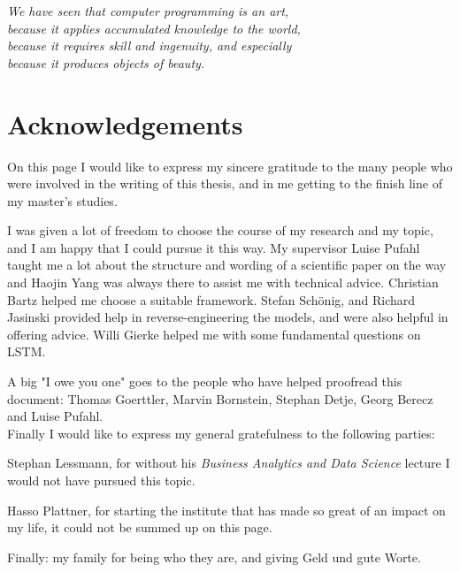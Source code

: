 
\begin{flushright}{\slshape
We have seen that computer programming is an art, \\
because it applies accumulated knowledge to the world, \\
because it requires skill and ingenuity, and especially \\
because it produces objects of beauty.} \\ \medskip
\end{flushright}

\bigskip


\begingroup

\let\clearpage\relax
\let\cleardoublepage\relax
\let\cleardoublepage\relax

\chapter*{Acknowledgements}
On this page I would like to express my sincere gratitude to the many people who were involved
in the writing of this thesis, and in me getting to the finish line of my master's studies.

I was given a lot of freedom to choose the course of my research and my topic,
and I am happy that I could pursue it this way. My supervisor Luise Pufahl
taught me a lot about the structure and wording of a scientific paper on the way
and Haojin Yang was always there to assist me with technical advice.
Christian Bartz helped me choose a suitable framework.
Stefan Schönig, and Richard Jasinski provided help in reverse-engineering the models,
and were also helpful in offering advice.
Willi Gierke helped me with some fundamental questions on LSTM.

A big "I owe you one" goes to the people who have helped proofread this document:
Thomas Goerttler, Marvin Bornstein, Stephan Detje, Georg Berecz and Luise Pufahl.\\

Finally I would like to express my general gratefulness to the following parties:

Stephan Lessmann, for without his \textit{Business Analytics and Data Science} lecture I would not have pursued this topic.

Hasso Plattner, for starting the institute that has made so great of an impact on my life, it could not be summed up on this page.

Finally: my family for being who they are, and giving Geld und gute Worte.
\endgroup
